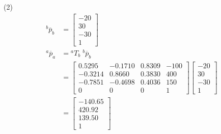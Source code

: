 \documentclass[UTF8, 12pt]{ctexart}
\begin{document}
(2)
\[
\begin{aligned}
    {}^b \overline{p}_b &=  \begin{bmatrix}
                    -20 \\ 30 \\ -30 \\ 1
                \end{bmatrix} \\
    {}^a \overline{p}_a &= {}^a T_b \; {}^b \overline{p}_b \\
            &=
            \begin{bmatrix}
                0.5295 & -0.1710 &  0.8309 & -100 \\
                -0.3214 &  0.8660 &  0.3830 & 400 \\
                -0.7851 & -0.4698 &  0.4036 & 150 \\
                0 & 0 & 0 & 1
            \end{bmatrix}
            \begin{bmatrix}
                -20 \\ 30 \\ -30 \\ 1
            \end{bmatrix} \\
            &=
            \begin{bmatrix}
                -140.65 \\ 420.92 \\ 139.50 \\ 1
            \end{bmatrix}
\end{aligned}
\]
\vspace{5em}
\end{document}
